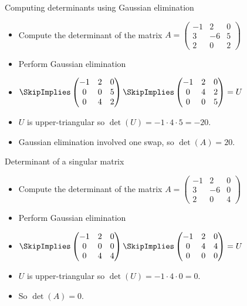 \documentclass{beamer}
\begin{document}

\begin{frame}{Computing determinants using Gaussian elimination}
\begin{itemize}
\item Compute the determinant of the matrix
$A=
\begin{pmatrix}
-1 & 2 & 0 \\
3 & -6 & 5 \\
2 & 0 & 2
\end{pmatrix}
$
\item Perform Gaussian elimination
\item
$
\SkipImplies
\begin{pmatrix}
-1 & 2 & 0 \\
0 & 0 & 5 \\
0 & 4 & 2
\end{pmatrix}
\SkipImplies
\begin{pmatrix}
-1 & 2 & 0 \\
0 & 4 & 2 \\
0 & 0 & 5 \\
\end{pmatrix}
= U
$
\item $U$ is upper-triangular so $\det(U) = -1 \cdot 4 \cdot 5 = -20$.
\item Gaussian elimination involved one swap, so $\det(A) = 20$.
\end{itemize}
\end{frame}


\begin{frame}{Determinant of a singular matrix}
\begin{itemize}
\item Compute the determinant of the matrix
$A=
\begin{pmatrix}
-1 & 2 & 0 \\
3 & -6 & 0 \\
2 & 0 & 4
\end{pmatrix}
$
\item Perform Gaussian elimination
\item
$
\SkipImplies
\begin{pmatrix}
-1 & 2 & 0 \\
0 & 0 & 0 \\
0 & 4 & 4
\end{pmatrix}
\SkipImplies
\begin{pmatrix}
-1 & 2 & 0 \\
0 & 4 & 4 \\
0 & 0 & 0 \\
\end{pmatrix}
= U
$
\item $U$ is upper-triangular so $\det(U) = -1 \cdot 4 \cdot 0 = 0$.
\item So $\det(A) = 0$.
\end{itemize}
\end{frame}
\end{document}
